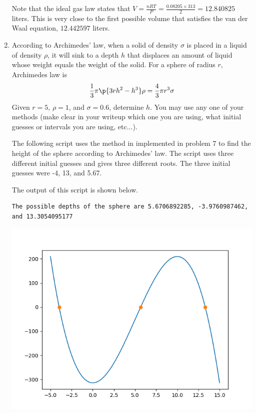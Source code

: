 \documentclass[11pt, oneside]{article}
\begin{document}
\begin{enumerate}
    Note that the ideal gas law states that
    $V = \frac{nRT}{P} = \frac{0.08205 \times 313}{2} = 12.840825$ liters.
    This is very close to the first possible volume that satisfies the van der
    Waal equation, $12.442597$ liters.

  \item %
    According to Archimedes' law, when a solid of density $\sigma$ is placed in a
    liquid of density $\rho$, it will sink to a depth $h$ that displaces an
    amount of liquid whose weight equals the weight of the solid.
    For a sphere of radius $r$, Archimedes law is
    \[
      \frac{1}{3} \pi \p{3rh^2 - h^3}\rho = \frac{4}{3}\pi r^3 \sigma
    \]
    Given $r = 5$, $\rho = 1$, and $\sigma = 0.6$, determine $h$.
    You may use any one of your methods (make clear in your writeup which one
    you are using, what initial guesses or intervals you are using, etc...).

    The following script uses the method in implemented in problem 7 to find the
    height of the sphere according to Archimedes' law.
    The script uses three different initial guesses and gives three different
    roots.
    The three initial guesses were -4, 13, and 5.67.
    

    The output of this script is shown below.
    \begin{verbatim}
The possible depths of the sphere are 5.6706892285, -3.9760987462, and 13.3054095177
    \end{verbatim}
    \begin{center}
      \includegraphics[scale=1]{Figures/01_2.png}
    \end{center}
\end{enumerate}
\end{document}
